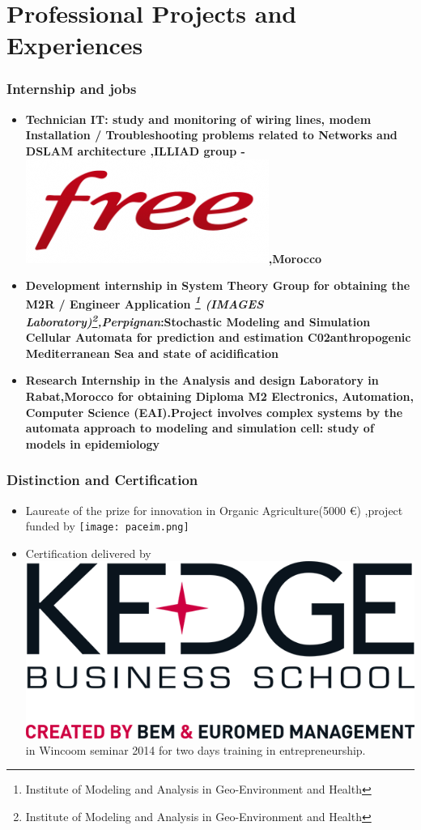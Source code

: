 \documentclass[smaller,brown]{beamer} %
\newcommand{\kedge}{\protect\includegraphics[height=5ex,keepaspectratio]{kedge.png}}
\newcommand{\paceim}{\protect\texttt{[image: paceim.png]}}
\newcommand{\free}{\protect\includegraphics[height=3ex,keepaspectratio]{free.png}}
\begin{document}
\section{Professional Projects and Experiences}
\begin{frame}
\frametitle{Internship and jobs}
{\small
\begin{description}
\begin{itemize}
\item <1-| alert@+> [2008-2009 :] {\bf Technician IT: study and monitoring of wiring lines, modem Installation / Troubleshooting
problems related to Networks and DSLAM architecture ,ILLIAD group -\free,Morocco}
\item <2-| alert@+> [2011 :] {\bf Development internship in System Theory Group for obtaining the M2R / Engineer
Application \textit{\footnote{Institute of Modeling and Analysis in Geo-Environment and Health} (IMAGES Laboratory)\footnote{Institute of Modeling and Analysis in Geo-Environment and Health},Perpignan}:\small{Stochastic Modeling and Simulation Cellular Automata for prediction and estimation C02anthropogenic Mediterranean Sea and state of acidification}}
\item <3-| alert@+> [2014 :] {\bf  Research Internship in the  Analysis and design  Laboratory in Rabat,Morocco for obtaining
Diploma M2 Electronics, Automation, Computer Science (EAI).\small{Project involves complex systems by the automata approach to modeling and simulation
cell: study of models in epidemiology }}

			
\end{itemize}
\end{description}}
\end{frame}
\begin{frame}
\frametitle{Distinction and Certification}
{\small
\begin{description}
\begin{itemize}
\item <1-| alert@+> [April 2014 :] Laureate of the prize for innovation in Organic Agriculture(5000 \euro) ,project funded by \paceim

\item <2-| alert@+> [ Nov 2014 :] Certification delivered by \kedge in Wincoom seminar 2014 for two days training in entrepreneurship.

\end{itemize}
\end{description}}
\end{frame}
\end{document}
